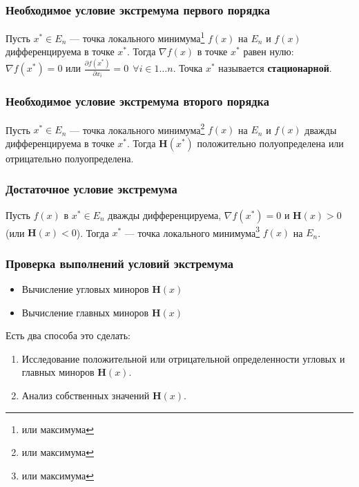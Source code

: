 \subsubsection{Необходимое условие экстремума первого порядка}

Пусть \(x^* \in E_n\) --- точка локального минимума\footnote{или максимума} \(f(x)\) на \(E_n\) и \(f(x)\) дифференцируема в точке \(x^*\). Тогда \(\nabla f(x)\) в точке \(x^*\) равен нулю: \(\nabla f(x^*) = 0\) или \(\frac{\partial f(x^*)}{\partial x_i} = 0 \ \ \forall i \in 1 \dots n \). Точка \(x^*\) называется \textbf{стационарной}.

\subsubsection{Необходимое условие экстремума второго порядка}

Пусть \(x^* \in E_n\) --- точка локального минимума\footnote{или максимума} \(f(x)\) на \(E_n\) и \(f(x)\) дважды дифференцируема в точке \(x^*\). Тогда \(\mathbf H(x^*)\) положительно полуопределена или отрицательно полуопределена.

\subsubsection{Достаточное условие экстремума}

Пусть \(f(x)\) в \(x^* \in E_n\) дважды дифференцируема, \(\nabla f(x^*) = 0\) и \(\mathbf H(x) > 0\) (или \(\mathbf H(x) < 0\)). Тогда \(x^*\) --- точка локального минимума\footnote{или максимума} \(f(x)\) на \(E_n\).

\subsubsection{Проверка выполнений условий экстремума}

\begin{itemize}
    \item Вычисление угловых миноров \(\mathbf H(x)\)
    \item Вычисление главных миноров \(\mathbf H(x)\)
\end{itemize}

Есть два способа это сделать:
\begin{enumerate}
    \item Исследование положительной или отрицательной определенности угловых и главных миноров \(\mathbf H(x)\).
    \item Анализ собственных значений \(\mathbf H(x)\).
\end{enumerate}


